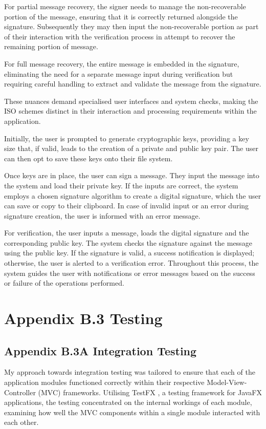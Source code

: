 \documentclass[]{final_report}
\theoremstyle{definition}
\begin{document}
For partial message recovery, the signer needs to manage the non-recoverable portion of the message, ensuring that it is correctly returned alongside the signature. Subsequently they may then input the non-recoverable portion as part of their interaction with the verification process in attempt to recover the remaining portion of message. 

For full message recovery, the entire message is embedded in the signature, eliminating the need for a separate message input during verification but requiring careful handling to extract and validate the message from the signature. 

These nuances demand specialised user interfaces and system checks, making the ISO schemes distinct in their interaction and processing requirements within the application.

Initially, the user is prompted to generate cryptographic keys, providing a key size that, if valid, leads to the creation of a private and public key pair. The user can then opt to save these keys onto their file system.

Once keys are in place, the user can sign a message. They input the message into the system and load their private key. If the inputs are correct, the system employs a chosen signature algorithm to create a digital signature, which the user can save or copy to their clipboard. In case of invalid input or an error during signature creation, the user is informed with an error message.

For verification, the user inputs a message, loads the digital signature and the corresponding public key. The system checks the signature against the message using the public key. If the signature is valid, a success notification is displayed; otherwise, the user is alerted to a verification error. Throughout this process, the system guides the user with notifications or error messages based on the success or failure of the operations performed.


 

\section{Appendix B.3 Testing}

\subsection{Appendix B.3A Integration Testing}
My approach towards integration testing was tailored to ensure that each of the application modules functioned correctly within their respective Model-View-Controller (MVC) frameworks. Utilising TestFX \cite{TestFX2023}, a testing framework for JavaFX applications, the testing concentrated on the internal workings of each module, examining how well the MVC components within a single module interacted with each other.
\end{document}
